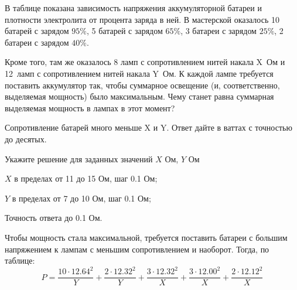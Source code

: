 
В таблице показана зависимость напряжения
аккумуляторной батареи и плотности электролита от процента заряда в ней. В мастерской
оказалось 10 батарей с зарядом $95 \%$, 5 батарей с зарядом $65 \%$, 3 батареи с
зарядом $25 \%$, 2 батареи \linebreak с зарядом $40 \%$.

Кроме
того, там же оказалось 8 ламп с сопротивлением нитей накала X~Ом и 12~ламп с
сопротивлением нитей накала Y~Ом. К каждой лампе требуется
поставить аккумулятор так, чтобы суммарное освещение (и, соответственно,
выделяемая мощность) было максимальным. Чему станет равна суммарная выделяемая
мощность в лампах в этот момент? 

Сопротивление батарей много меньше X и Y. Ответ дайте в ваттах с точностью до десятых.

Укажите решение для заданных значений $X$ Ом, $Y$ Ом

\paramSection

$X$ в пределах от 11 до 15 Ом, шаг 0.1 Ом; 

$Y$ в пределах от 7 до 10 Ом, шаг 0.1 Ом; 

Точность ответа до 0.1 Ом.

\solutionSection

Чтобы мощность стала максимальной, требуется поставить батареи с большим напряжением к 
лампам с меньшим сопротивлением и наоборот. Тогда, по таблице:
$$P=\frac{10 \cdot 12.64^2}{Y} + \frac{2 \cdot 12.32^2}{Y}+\frac{3 \cdot 12.32^2}{X}+\frac{3 \cdot 12.00^2}{X}+\frac{2 \cdot 12.12^2}{X}$$


